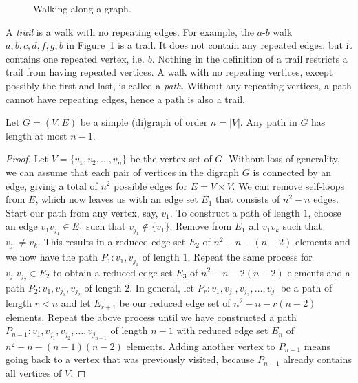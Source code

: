 \begin{figure}[!htbp]
\centering

\caption{Walking along a graph.}
\label{fig:introduction:types_of_walks}
\end{figure}

A \emph{trail} is a walk with no repeating edges. For
example, the $a$-$b$ walk $a, b, c, d, f, g, b$ in
Figure~\ref{fig:introduction:types_of_walks} is a trail. It does not
contain any repeated edges, but it contains one repeated vertex,
i.e. $b$. Nothing in the definition of a trail restricts a trail from
having repeated vertices. A walk with no repeating vertices, except
possibly the first and last, is called a \emph{path}.
Without any repeating vertices, a path cannot have repeating edges,
hence a path is also a trail.

\begin{proposition}
\label{prop:introduction:any_path_has_length_at_most_n_minus_1}
Let $G = (V, E)$ be a simple (di)graph of order $n = |V|$. Any path in $G$
has length at most $n - 1$.
\end{proposition}

\begin{proof}
Let $V = \{v_1, v_2, \dots, v_n\}$ be the vertex set of $G$. Without
loss of generality, we can assume that each pair of vertices in
the digraph $G$ is connected by an edge, giving a total of $n^2$
possible edges for $E = V \times V$. We can remove self-loops from
$E$, which now leaves us with an edge set $E_1$ that consists of
$n^2 - n$ edges. Start our path from any vertex, say, $v_1$. To
construct a path of length $1$, choose an edge $v_1 v_{j_1} \in E_1$
such that $v_{j_1} \notin \{v_1\}$. Remove from $E_1$ all $v_1 v_k$
such that $v_{j_1} \neq v_k$. This results in a reduced edge set $E_2$
of $n^2 - n - (n - 2)$ elements and we now have the path
$P_1: v_1, v_{j_1}$ of length $1$. Repeat the same process for
$v_{j_1} v_{j_2} \in E_2$ to obtain a reduced edge set $E_3$ of
$n^2 - n - 2(n - 2)$ elements and a path $P_2: v_1, v_{j_1}, v_{j_2}$
of length $2$. In general, let
$P_r: v_1, v_{j_1}, v_{j_2}, \dots, v_{j_r}$ be a path of length
$r < n$ and let $E_{r+1}$ be our reduced edge set of
$n^2 - n - r(n - 2)$ elements. Repeat the above process until we have
constructed a path
$P_{n-1}: v_1, v_{j_1}, v_{j_2}, \dots, v_{j_{n-1}}$ of length $n - 1$
with reduced edge set $E_n$ of $n^2 - n - (n - 1)(n - 2)$
elements. Adding another vertex to $P_{n-1}$ means going back to a
vertex that was previously visited, because $P_{n-1}$ already contains
all vertices of $V$.
\end{proof}

